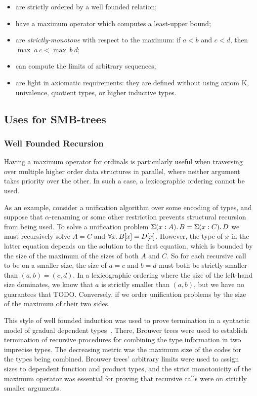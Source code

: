 \begin{itemize}
  \item are strictly ordered by a well founded relation;
  \item have a maximum operator which computes a least-upper bound;
  \item are \textit{strictly-monotone} with respect to the maximum: if $a < b$ and $c < d$, then $\max\ a\ c < \max\ b\ d$;
  \item can compute the limits of arbitrary sequences;
  \item are light in axiomatic requirements: they are defined without using axiom K,
        univalence, quotient types, or higher inductive types.
\end{itemize}


\subsection{Uses for SMB-trees}

\subsubsection{Well Founded Recursion}

Having a maximum operator for ordinals is particularly useful when traversing over multiple higher order
data structures in parallel, where neither argument takes priority over the other.
In such a case, a lexicographic ordering cannot be used.


As an example, consider a unification algorithm over some encoding of types, and suppose that $\alpha$-renaming or some other restriction prevents
structural recursion from being used.
To solve a unification problem $ \Sigma(x : A)\ldotp B = \Sigma(x : C)\ldotp D$
we must recursively
solve $A = C$ and $\forall x \ldotp B[x] = D[x]$.
However, the type of $x$ in the latter equation depends on the solution
to the first equation, which is bounded by the size of the maximum of the sizes
of both $A$ and $C$.
So for each recursive call to be on a smaller size,
the size of $a = c$ and $b = d$ must both be strictly smaller than
$(a,b)=(c,d)$. In a lexicographic ordering where the size of the left-hand size
dominates, we know that $a$ is strictly smaller than $(a,b)$, but we have no
guarantees that TODO.
Conversely, if we order unification problems by the size of the maximum of their
two sides.


This style of well founded induction was used to prove termination
in a syntactic model of gradual dependent types~\citep{TODO}. There, Brouwer trees
were used to establish termination of recursive procedures for
combining the type information in two imprecise types.
The decreasing metric was the maximum size of the codes for the types being combined. Brouwer trees' arbitrary limits were used to assign sizes
to dependent function and product types, and the strict monotonicity of the
maximum operator was essential for proving that recursive calls were on
strictly smaller arguments.

